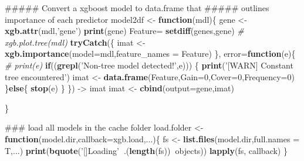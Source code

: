 \documentclass[]{article}
\newenvironment{Shaded}{\begin{snugshade}}{\end{snugshade}}
\newcommand{\KeywordTok}[1]{\textcolor[rgb]{0.13,0.29,0.53}{\textbf{#1}}}
\newcommand{\DataTypeTok}[1]{\textcolor[rgb]{0.13,0.29,0.53}{#1}}
\newcommand{\DecValTok}[1]{\textcolor[rgb]{0.00,0.00,0.81}{#1}}
\newcommand{\StringTok}[1]{\textcolor[rgb]{0.31,0.60,0.02}{#1}}
\newcommand{\CommentTok}[1]{\textcolor[rgb]{0.56,0.35,0.01}{\textit{#1}}}
\newcommand{\ControlFlowTok}[1]{\textcolor[rgb]{0.13,0.29,0.53}{\textbf{#1}}}
\newcommand{\OperatorTok}[1]{\textcolor[rgb]{0.81,0.36,0.00}{\textbf{#1}}}
\newcommand{\NormalTok}[1]{#1}
\theoremstyle{definition}
\theoremstyle{definition}
\theoremstyle{definition}
\theoremstyle{remark}
\begin{document}
\begin{Shaded}
\begin{Highlighting}[]
{\NormalTok{##### Convert a xgboost model to data.frame that }
\NormalTok{##### outlines importance of each predictor}
\NormalTok{model2df <-}\StringTok{ }\ControlFlowTok{function}\NormalTok{(mdl)\{}
\NormalTok{  gene <-}\StringTok{ }\KeywordTok{xgb.attr}\NormalTok{(mdl,}\StringTok{'gene'}\NormalTok{)}
  \KeywordTok{print}\NormalTok{(gene)}
\NormalTok{  Feature=}\StringTok{ }\KeywordTok{setdiff}\NormalTok{(genes,gene)}
  \CommentTok{# xgb.plot.tree(mdl)}
  \KeywordTok{tryCatch}\NormalTok{(\{}
\NormalTok{    imat <-}\StringTok{ }\KeywordTok{xgb.importance}\NormalTok{(}\DataTypeTok{model=}\NormalTok{mdl,}\DataTypeTok{feature_names =}\NormalTok{ Feature)}
\NormalTok{  \},}
  \DataTypeTok{error=}\ControlFlowTok{function}\NormalTok{(e)\{}
    \CommentTok{# print(e)}
    \ControlFlowTok{if}\NormalTok{((}\KeywordTok{grepl}\NormalTok{(}\StringTok{'Non-tree model detected!'}\NormalTok{,e))) \{}
      \KeywordTok{print}\NormalTok{(}\StringTok{'[WARN] Constant tree encountered'}\NormalTok{)}
\NormalTok{      imat <-}\StringTok{ }\KeywordTok{data.frame}\NormalTok{(Feature,}\DataTypeTok{Gain=}\DecValTok{0}\NormalTok{,}\DataTypeTok{Cover=}\DecValTok{0}\NormalTok{,}\DataTypeTok{Frequency=}\DecValTok{0}\NormalTok{)}
\NormalTok{    \}}\ControlFlowTok{else}\NormalTok{\{}
      \KeywordTok{stop}\NormalTok{(e)}
\NormalTok{    \}}
\NormalTok{  \}) ->}\StringTok{ }\NormalTok{imat}
\NormalTok{  imat <-}\StringTok{ }\KeywordTok{cbind}\NormalTok{(}\DataTypeTok{output=}\NormalTok{gene,imat)}

\NormalTok{\}}

\NormalTok{### load all models in the cache folder}
\NormalTok{load.folder <-}\StringTok{ }\ControlFlowTok{function}\NormalTok{(model.dir,}\DataTypeTok{callback=}\NormalTok{xgb.load,...)\{}
\NormalTok{  fs <-}\StringTok{ }\KeywordTok{list.files}\NormalTok{(model.dir,}\DataTypeTok{full.names =}\NormalTok{ T,...)}
  \KeywordTok{print}\NormalTok{(}\KeywordTok{bquote}\NormalTok{(}\StringTok{'[]Loading'}\OperatorTok{~}\NormalTok{.(}\KeywordTok{length}\NormalTok{(fs))}\OperatorTok{~}\NormalTok{objects))}
  \KeywordTok{lapply}\NormalTok{(fs, callback)}
\NormalTok{\}}


}
\end{Highlighting}
\end{Shaded}
\end{document}
